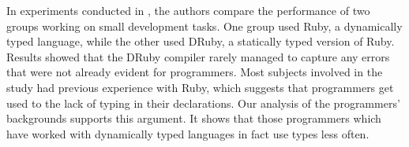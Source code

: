 \documentclass[preprint]{sigplanconf}
\begin{document}
% 

In experiments conducted in \cite{ruby_vs_druby}, the authors compare the performance of two groups working on small development tasks.
One group used Ruby, a dynamically typed language, while the other used DRuby, a statically typed version of Ruby. 
Results showed that the DRuby compiler rarely managed to capture any errors that were not already evident for programmers.
Most subjects involved in the study had previous experience with Ruby, which suggests that programmers get used to the lack of typing in their declarations.
Our analysis of the programmers' backgrounds supports this argument.
It shows that those programmers which have worked with dynamically typed languages in fact use types less often.








%
%
\end{document}
